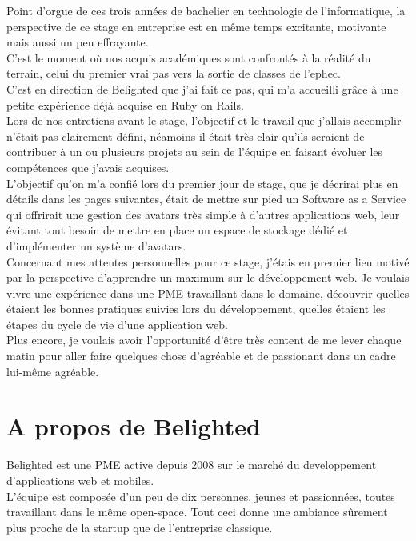 \documentclass{report}
\begin{document}
  Point d'orgue de ces trois années de bachelier en technologie de l'informatique, la perspective de ce stage en entreprise
  est en même temps excitante, motivante mais aussi un peu effrayante.\\
  C'est le moment où nos acquis académiques sont confrontés à la réalité du terrain, celui du premier vrai pas vers la sortie
  de classes de l'ephec.\\

  C'est en direction de Belighted que j'ai fait ce pas, qui m'a accueilli grâce à une petite expérience déjà acquise en Ruby on Rails.\\
  Lors de nos entretiens avant le stage, l'objectif et le travail que j'allais accomplir n'était pas clairement défini, néamoins il était
  très clair qu'ils seraient de contribuer à un ou plusieurs projets au sein de l'équipe en faisant évoluer les compétences que j'avais acquises.\\
  L'objectif qu'on m'a confié lors du premier jour de stage, que je décrirai plus en détails dans les pages suivantes, était de mettre sur pied un Software as a Service qui offrirait une gestion des avatars très simple
  à d'autres applications web, leur évitant tout besoin de mettre en place un espace de stockage dédié et d'implémenter un
  système d'avatars.\\

  Concernant mes attentes personnelles pour ce stage, j'étais en premier lieu motivé par la perspective d'apprendre un maximum
  sur le développement web. Je voulais vivre une expérience dans une PME travaillant dans le domaine, découvrir quelles étaient les bonnes
  pratiques suivies lors du développement, quelles étaient les étapes du cycle de vie d'une application web.\\
  Plus encore, je voulais avoir l'opportunité d'être très content de me lever chaque matin pour aller faire quelques chose d'agréable et de passionant
  dans un cadre lui-même agréable.\\


\chapter{A propos de Belighted}

  Belighted est une PME active depuis 2008 sur le marché du developpement d'applications web et mobiles.\\
  L'équipe est composée d'un peu de dix personnes, jeunes et passionnées, toutes travaillant dans le même open-space. Tout ceci donne
  une ambiance sûrement plus proche de la startup que de l'entreprise classique.\\
\end{document}
